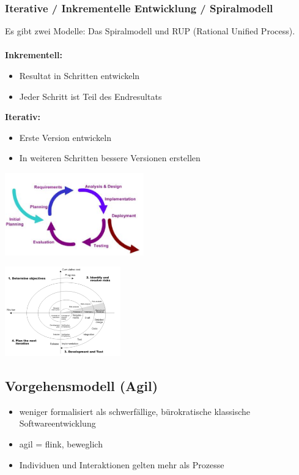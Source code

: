 \subsubsection{Iterative / Inkrementelle Entwicklung / Spiralmodell}
\begin{minipage}{8cm}
Es gibt zwei Modelle: Das Spiralmodell und RUP (Rational Unified Process).\\
\\
	\textbf{Inkrementell:}
		\begin{itemize}
			\item Resultat in Schritten entwickeln
			\item Jeder Schritt ist Teil des Endresultats
		\end{itemize}
	\textbf{Iterativ:}
		\begin{itemize}					
			\item Erste Version entwickeln
			\item In weiteren Schritten bessere Versionen erstellen
		\end{itemize}
\end{minipage}
\begin{minipage}{6cm}
	\includegraphics[width=6cm]{images/iterative_entwicklung.png}
\end{minipage}
\begin{minipage}{8cm}
	\includegraphics[width=5cm]{images/spiral_modell.png}
\end{minipage}


\subsection{Vorgehensmodell (Agil)}
\begin{itemize}
	\item weniger formalisiert als schwerfällige, bürokratische klassische Softwareentwicklung
	\item agil = flink, beweglich
	\item Individuen und Interaktionen gelten mehr als Prozesse
\end{itemize}

